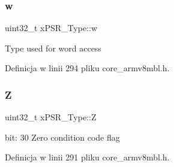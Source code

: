 \subsubsection{\texorpdfstring{w}{w}}
{\footnotesize\ttfamily uint32\+\_\+t x\+P\+S\+R\+\_\+\+Type\+::w}

Type used for word access 

Definicja w linii 294 pliku core\+\_\+armv8mbl.\+h.

\mbox{\label{unionx_p_s_r___type_a1e5d9801013d5146f2e02d9b7b3da562}} 
\subsubsection{\texorpdfstring{Z}{Z}}
{\footnotesize\ttfamily uint32\+\_\+t x\+P\+S\+R\+\_\+\+Type\+::Z}

bit\+: 30 Zero condition code flag 

Definicja w linii 291 pliku core\+\_\+armv8mbl.\+h.




